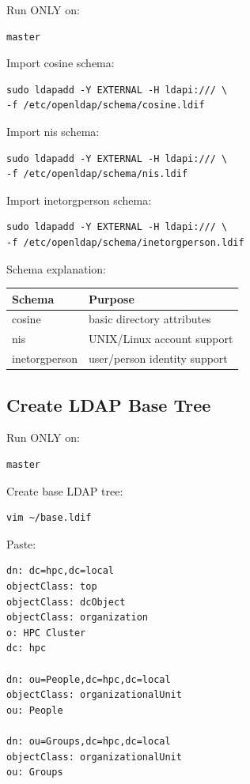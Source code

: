 \documentclass[11pt]{article}
\begin{document}
Run ONLY on:

\begin{verbatim}
master
\end{verbatim}

Import cosine schema:

\begin{verbatim}
sudo ldapadd -Y EXTERNAL -H ldapi:/// \
-f /etc/openldap/schema/cosine.ldif
\end{verbatim}

Import nis schema:

\begin{verbatim}
sudo ldapadd -Y EXTERNAL -H ldapi:/// \
-f /etc/openldap/schema/nis.ldif
\end{verbatim}

Import inetorgperson schema:

\begin{verbatim}
sudo ldapadd -Y EXTERNAL -H ldapi:/// \
-f /etc/openldap/schema/inetorgperson.ldif
\end{verbatim}

Schema explanation:

\begin{center}
\begin{tabular}{ll}
Schema & Purpose\\
\hline
cosine & basic directory attributes\\
nis & UNIX/Linux account support\\
inetorgperson & user/person identity support\\
\end{tabular}
\end{center}
\subsection{Create LDAP Base Tree}
\label{sec:org92826f1}

Run ONLY on:

\begin{verbatim}
master
\end{verbatim}

Create base LDAP tree:

\begin{verbatim}
vim ~/base.ldif
\end{verbatim}

Paste:

\begin{verbatim}
dn: dc=hpc,dc=local
objectClass: top
objectClass: dcObject
objectClass: organization
o: HPC Cluster
dc: hpc

dn: ou=People,dc=hpc,dc=local
objectClass: organizationalUnit
ou: People

dn: ou=Groups,dc=hpc,dc=local
objectClass: organizationalUnit
ou: Groups
\end{verbatim}
\end{document}
